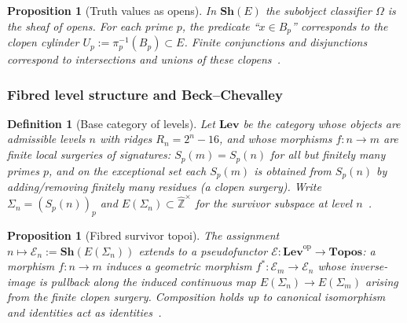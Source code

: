 \documentclass[12pt]{article}
\newtheorem{proposition}[theorem]{Proposition}
\newtheorem{definition}[theorem]{Definition}
\numberwithin{equation}{section}
\newcommand{\Z}{\mathbb{Z}}
\begin{document}
\begin{proposition}[Truth values as opens]\label{prop:Omega-pred}
In $\mathbf{Sh}(E)$ the subobject classifier $\Omega$ is the sheaf of opens. For each prime $p$, the predicate ``$x\in B_p$'' corresponds to the clopen cylinder $U_p:=\pi_p^{-1}(B_p)\subset E$. Finite conjunctions and disjunctions correspond to intersections and unions of these clopens~\cite{SpivackUGPFormalization,ugp-lean}.
\end{proposition}


\subsubsection{Fibred level structure and Beck--Chevalley}\label{subsec:B3-fibred}

\begin{definition}[Base category of levels]\label{def:level-base}
Let $\mathbf{Lev}$ be the category whose objects are admissible levels $n$ with ridges $R_n=2^n-16$, and whose morphisms $f:n\to m$ are \emph{finite local surgeries} of signatures: $S_p(m)=S_p(n)$ for all but finitely many primes $p$, and on the exceptional set each $S_p(m)$ is obtained from $S_p(n)$ by adding/removing finitely many residues (a clopen surgery). Write $\Sigma_n=(S_p(n))_p$ and $E(\Sigma_n)\subset \widehat{\Z}^{\times}$ for the survivor subspace at level $n$~\cite{SpivackUGPFormalization,ugp-lean}.
\end{definition}

\begin{proposition}[Fibred survivor topoi]\label{prop:fibred-topoi}
The assignment $n\mapsto \mathcal{E}_n:=\mathbf{Sh}(E(\Sigma_n))$ extends to a pseudofunctor $\mathcal{E}:\mathbf{Lev}^{\mathrm{op}}\to \mathbf{Topos}$: a morphism $f:n\to m$ induces a geometric morphism $f^{\ast}:\mathcal{E}_m\to \mathcal{E}_n$ whose inverse-image is pullback along the induced continuous map $E(\Sigma_n)\to E(\Sigma_m)$ arising from the finite clopen surgery. Composition holds up to canonical isomorphism and identities act as identities~\cite{SpivackUGPFormalization,ugp-lean}.
\end{proposition}
\end{document}
